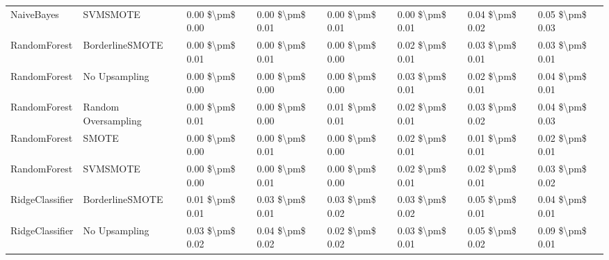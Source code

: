 \begin{tabular}{llllllll}
                     NaiveBayes &                      SVMSMOTE & 0.00 \$\textbackslash pm\$ 0.00 &           0.00 \$\textbackslash pm\$ 0.01 &       0.00 \$\textbackslash pm\$ 0.01 &        0.00 \$\textbackslash pm\$ 0.01 &                         0.04 \$\textbackslash pm\$ 0.02 &     0.05 \$\textbackslash pm\$ 0.03 \\
                   RandomForest &               BorderlineSMOTE & 0.00 \$\textbackslash pm\$ 0.01 &           0.00 \$\textbackslash pm\$ 0.01 &       0.00 \$\textbackslash pm\$ 0.00 &        0.02 \$\textbackslash pm\$ 0.01 &                         0.03 \$\textbackslash pm\$ 0.01 &     0.03 \$\textbackslash pm\$ 0.01 \\
                   RandomForest &                 No Upsampling & 0.00 \$\textbackslash pm\$ 0.00 &           0.00 \$\textbackslash pm\$ 0.00 &       0.00 \$\textbackslash pm\$ 0.00 &        0.03 \$\textbackslash pm\$ 0.01 &                         0.02 \$\textbackslash pm\$ 0.01 &     0.04 \$\textbackslash pm\$ 0.01 \\
                   RandomForest &           Random Oversampling & 0.00 \$\textbackslash pm\$ 0.01 &           0.00 \$\textbackslash pm\$ 0.00 &       0.01 \$\textbackslash pm\$ 0.01 &        0.02 \$\textbackslash pm\$ 0.01 &                         0.03 \$\textbackslash pm\$ 0.02 &     0.04 \$\textbackslash pm\$ 0.03 \\
                   RandomForest &                         SMOTE & 0.00 \$\textbackslash pm\$ 0.00 &           0.00 \$\textbackslash pm\$ 0.01 &       0.00 \$\textbackslash pm\$ 0.00 &        0.02 \$\textbackslash pm\$ 0.01 &                         0.01 \$\textbackslash pm\$ 0.01 &     0.02 \$\textbackslash pm\$ 0.01 \\
                   RandomForest &                      SVMSMOTE & 0.00 \$\textbackslash pm\$ 0.00 &           0.00 \$\textbackslash pm\$ 0.01 &       0.00 \$\textbackslash pm\$ 0.00 &        0.02 \$\textbackslash pm\$ 0.01 &                         0.02 \$\textbackslash pm\$ 0.01 &     0.03 \$\textbackslash pm\$ 0.02 \\
                RidgeClassifier &               BorderlineSMOTE & 0.01 \$\textbackslash pm\$ 0.01 &           0.03 \$\textbackslash pm\$ 0.01 &       0.03 \$\textbackslash pm\$ 0.02 &        0.03 \$\textbackslash pm\$ 0.02 &                         0.05 \$\textbackslash pm\$ 0.01 &     0.04 \$\textbackslash pm\$ 0.01 \\
                RidgeClassifier &                 No Upsampling & 0.03 \$\textbackslash pm\$ 0.02 &           0.04 \$\textbackslash pm\$ 0.02 &       0.02 \$\textbackslash pm\$ 0.02 &        0.03 \$\textbackslash pm\$ 0.01 &                         0.05 \$\textbackslash pm\$ 0.02 &     0.09 \$\textbackslash pm\$ 0.01 \\

\end{tabular}
